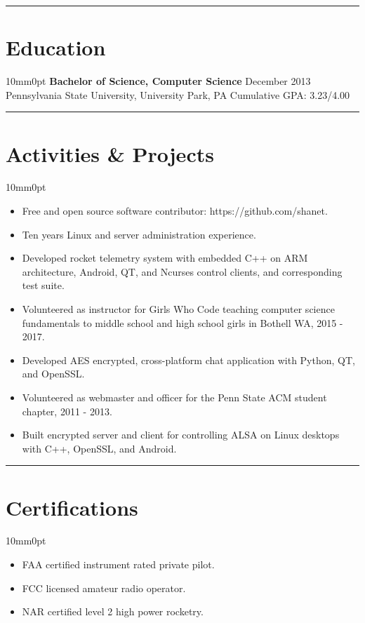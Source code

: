 \documentclass[letterpaper]{article}
\newcommand{\sectionrule}[1] {
  \noindent\rule{\textwidth}{.1mm}
  \vspace{-11mm}
  \section{#1}
}
\newenvironment{indentsection}
  {\begin{adjustwidth}{10mm}{0pt}}
  {\end{adjustwidth}}
\begin{document}
  \sectionrule{Education}

  \begin{indentsection}
    \textbf{Bachelor of Science, Computer Science} \hfill December 2013\\
    Pennsylvania State University, University Park, PA \hfill Cumulative GPA: 3.23/4.00
  \end{indentsection}

  \sectionrule{Activities \& Projects}

  \begin{indentsection}
    \begin{itemize}
      \item Free and open source software contributor: https://github.com/shanet.
      \item Ten years Linux and server administration experience.
      \item Developed rocket telemetry system with embedded C++ on ARM architecture, Android, QT, and Ncurses control clients, and corresponding test suite.
      \item Volunteered as instructor for Girls Who Code teaching computer science fundamentals to middle school and high school girls in Bothell WA, 2015 - 2017.
      \item Developed AES encrypted, cross-platform chat application with Python, QT, and OpenSSL.
      \item Volunteered as webmaster and officer for the Penn State ACM student chapter, 2011 - 2013.
      \item Built encrypted server and client for controlling ALSA on Linux desktops with C++, OpenSSL, and Android.
    \end{itemize}
  \end{indentsection}

  \sectionrule{Certifications}

  \begin{indentsection}
    \begin{itemize}
      \item FAA certified instrument rated private pilot.
      \item FCC licensed amateur radio operator.
      \item NAR certified level 2 high power rocketry.
    \end{itemize}
  \end{indentsection}
\end{document}

